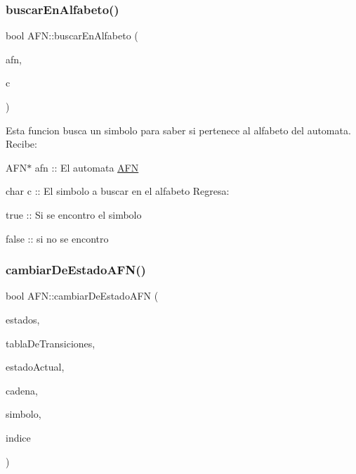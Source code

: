 \subsubsection{\texorpdfstring{buscar\+En\+Alfabeto()}{buscarEnAlfabeto()}}
{\footnotesize\ttfamily bool A\+F\+N\+::buscar\+En\+Alfabeto (\begin{DoxyParamCaption}\item[{\hyperlink{class_a_f_n}{A\+FN} $\ast$}]{afn,  }\item[{char}]{c }\end{DoxyParamCaption})}

Esta funcion busca un simbolo para saber si pertenece al alfabeto del automata. Recibe\+:
\begin{DoxyItemize}
\item A\+F\+N$\ast$ afn \+:\+: El automata \hyperlink{class_a_f_n}{A\+FN}
\item char c \+:\+: El simbolo a buscar en el alfabeto Regresa\+:
\end{DoxyItemize}

true \+:\+: Si se encontro el simbolo
\begin{DoxyItemize}
\item false \+:\+: si no se encontro 
\end{DoxyItemize}\mbox{\label{class_a_f_n_afb6a2f99f54906074bd00e49538ea1f7}} 
\subsubsection{\texorpdfstring{cambiar\+De\+Estado\+A\+F\+N()}{cambiarDeEstadoAFN()}}
{\footnotesize\ttfamily bool A\+F\+N\+::cambiar\+De\+Estado\+A\+FN (\begin{DoxyParamCaption}\item[{std\+::vector$<$ \hyperlink{class_estado}{Estado} $\ast$$>$}]{estados,  }\item[{std\+::vector$<$ \hyperlink{class_transicion}{Transicion} $\ast$$>$}]{tabla\+De\+Transiciones,  }\item[{\hyperlink{class_estado}{Estado} $\ast$}]{estado\+Actual,  }\item[{std\+::string}]{cadena,  }\item[{char}]{simbolo,  }\item[{int}]{indice }\end{DoxyParamCaption})}

